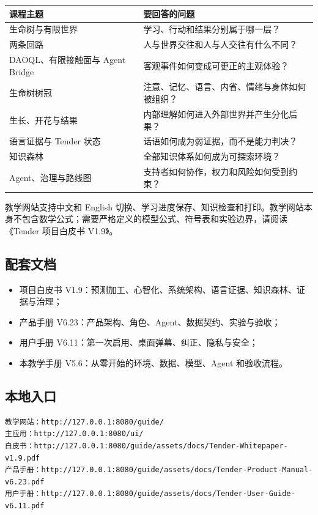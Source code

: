 \documentclass[UTF8,a4paper,11pt]{ctexart}
\begin{document}
\begin{center}
\begin{longtable}{@{}p{3.6cm}p{8.0cm}@{}}
\toprule
\textbf{课程主题} & \textbf{要回答的问题} \\
\midrule
生命树与有限世界 & 学习、行动和结果分别属于哪一层？ \\
两条回路 & 人与世界交往和人与人交往有什么不同？ \\
DAOQL、有限接触面与 Agent Bridge & 客观事件如何变成可更正的主观体验？ \\
生命树树冠 & 注意、记忆、语言、内省、情绪与身体如何被组织？ \\
生长、开花与结果 & 内部理解如何进入外部世界并产生分化后果？ \\
语言证据与 Tender 状态 & 话语如何成为弱证据，而不是能力判决？ \\
知识森林 & 全部知识体系如何成为可探索环境？ \\
Agent、治理与路线图 & 支持者如何协作，权力和风险如何受到约束？ \\
\bottomrule
\end{longtable}
\end{center}

教学网站支持中文和 English 切换、学习进度保存、知识检查和打印。教学网站本身不包含数学公式；需要严格定义的模型公式、符号表和实验边界，请阅读《Tender 项目白皮书 V1.9》。

\subsection{配套文档}

\begin{itemize}
\item 项目白皮书 V1.9：预测加工、心智化、系统架构、语言证据、知识森林、证据与治理；
\item 产品手册 V6.23：产品架构、角色、Agent、数据契约、实验与验收；
\item 用户手册 V6.11：第一次启用、桌面弹幕、纠正、隐私与安全；
\item 本教学手册 V5.6：从零开始的环境、数据、模型、Agent 和验收流程。
\end{itemize}

\subsection{本地入口}

\begin{verbatim}
教学网站：http://127.0.0.1:8080/guide/
主应用：http://127.0.0.1:8080/ui/
白皮书：http://127.0.0.1:8080/guide/assets/docs/Tender-Whitepaper-v1.9.pdf
产品手册：http://127.0.0.1:8080/guide/assets/docs/Tender-Product-Manual-v6.23.pdf
用户手册：http://127.0.0.1:8080/guide/assets/docs/Tender-User-Guide-v6.11.pdf
\end{verbatim}
\end{document}
